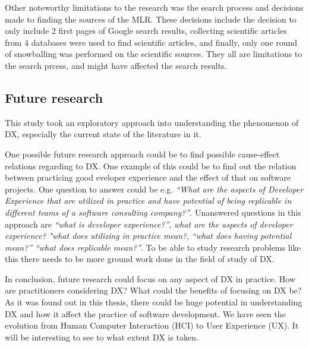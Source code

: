 \documentclass[english, 12pt, a4paper, sci, utf8, a-1b, online]{aaltothesis}
\begin{document}
Other noteworthy limitations to the research was the search process and decisions made to finding the sources of the MLR. These decisions include the decision to only include 2 first pages of Google search results, collecting scientific articles from 4 databases were used to find scientific articles, and finally, only one round of snowballing was performed on the scientific sources. They all are limitations to the search prcess, and might have affected the search results.



\subsection{Future research}

This study took an exploratory approach into understanding the phenomenon of DX, especially the current state of the literature in it.

One possible future research approach could be to find possible cause-effect relations regarding to DX. One example of this could be to find out the relation between practicing good eveloper experience and the effect of that on software projects. One question to answer could be e.g. \textit{``What are the aspects of Developer Experience that are utilized in practice and have potential of being replicable in different teams of a software consulting company?''}. Unanswered questions in this approach are \textit{``what is developer experience?''}, \textit{what are the aspects of developer experience?} \textit{"what does utilizing in practice mean?}, \textit{``what does having potential mean?''} \textit{``what does replicable mean?''}. To be able to study research problems like this there needs to be more ground work done in the field of study of DX.

In conclusion, future research could focus on any aspect of DX in practice. How are practitioners considering DX? What could the benefits of focusing on DX be? As it was found out in this thesis, there could be huge potential in understanding DX and how it affect the practice of software development. We have seen the evolution from Human Computer Interaction (HCI) to User Experience (UX). It will be interesting to see to what extent DX is taken.
\end{document}
